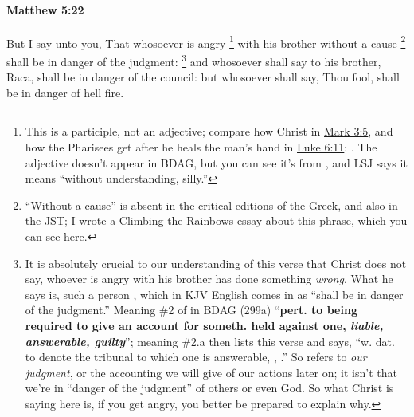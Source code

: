 		\paragraph{Matthew 5:22} %
			\label{MATTHEW-5-22}

			But I say unto you, That whosoever is angry%
				\footnote{%
					This is a participle, not an adjective; compare how Christ  in \hyperref[MARK-3-5]{Mark 3:5}, and how the Pharisees get after he heals the man's hand in \hyperref[LUKE-6-11]{Luke 6:11}: . The adjective  doesn't appear in BDAG, but you can see it's from , and LSJ says it means ``without understanding, silly.''
					}
			with his brother without a cause%
				\footnote{%
					``Without a cause'' is absent in the critical editions of the Greek, and also in the JST; I wrote a Climbing the Rainbows essay about this phrase, which you can see \href{https://drive.google.com/file/d/18JUkvsQXogUnfXRDGKNx31-bCx2OLJr7/view?usp=share_link}{here}.
					}
			shall be in danger of the judgment:%
				\footnote{%
					It is absolutely crucial to our understanding of this verse that Christ does not say, whoever is angry with his brother has done something \textit{wrong}. What he says is, such a person , which in KJV English comes in as ``shall be in danger of the judgment.'' Meaning \#2 of  in BDAG (299a) ``\textbf{pert. to being required to give an account for someth. held against one, \textit{liable, answerable, guilty}}''; meaning \#2.a then lists this verse and says, ``w. dat. to denote the tribunal to which one is answerable, , .'' So  refers to \textit{our judgment}, or the accounting we will give of our actions later on; it isn't that we're in ``danger of the judgment'' of others or even God. So what Christ is saying here is, if you get angry, you better be prepared to explain why.
					}
			and whosoever shall say to his brother, Raca, shall be in danger of the council: but whosoever shall say, Thou fool, shall be in danger of hell fire.

